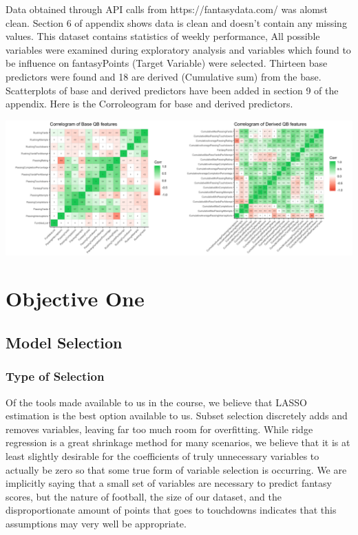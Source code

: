 \documentclass[american,]{article}
\begin{document}
Data obtained through API calls from https://fantasydata.com/ was alomst clean. Section 6 of appendix shows data is clean and doesn't contain any missing values. This dataset contains statistics of weekly performance, All possible variables were examined during exploratory analysis and variables which found to be influence on fantasyPoints (Target Variable) were selected. Thirteen base predictors were found and 18 are derived (Cumulative sum) from the base. Scatterplots of base and derived predictors have been added in section 9 of the appendix. Here is the Corroleogram for base and derived predictors. 
\graphicspath{ {images/} }
\includegraphics{img001.png}


\section{Objective One}\label{objective-one}

\subsection{Model Selection}\label{model-selection}

\subsubsection{Type of Selection}\label{type-of-selection}

Of the tools made available to us in the course, we believe that LASSO
estimation is the best option available to us. Subset selection
discretely adds and removes variables, leaving far too much room for
overfitting. While ridge regression is a great shrinkage method for many
scenarios, we believe that it is at least slightly desirable for the
coefficients of truly unnecessary variables to actually be zero so that
some true form of variable selection is occurring. We are implicitly
saying that a small set of variables are necessary to predict fantasy
scores, but the nature of football, the size of our dataset, and the
disproportionate amount of points that goes to touchdowns indicates that
this assumptions may very well be appropriate.
\end{document}
